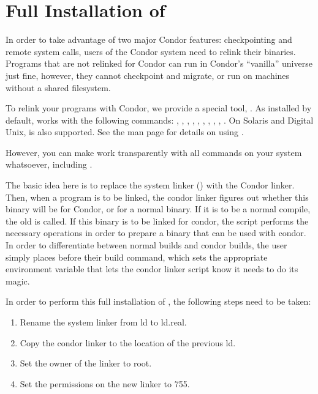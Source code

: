 \section{Full Installation of }

In order to take advantage of two major Condor features: checkpointing
and remote system calls, users of the Condor system need to relink
their binaries.  Programs that are not relinked for Condor can run in
Condor's ``vanilla'' universe just fine, however, they cannot
checkpoint and migrate, or run on machines without a shared filesystem.

To relink your programs with Condor, we provide a special tool,
.  As installed by default,  works
with the following commands: , , ,
, , , , ,
, .  On Solaris and Digital Unix,  is
also supported.  See the  man page for details on
using .

However, you can make  work transparently with all
commands on your system whatsoever, including .  

The basic idea here is to replace the system linker () with
the Condor linker.  Then, when a program is to be linked, the condor
linker figures out whether this binary will be for Condor, or for a
normal binary.  If it is to be a normal compile, the old  is
called.  If this binary is to be linked for condor, the script
performs the necessary operations in order to prepare a binary that
can be used with condor.  In order to differentiate between normal
builds and condor builds, the user simply places 
 before their build command, which sets the
appropriate environment variable that lets the condor linker script
know it needs to do its magic.

In order to perform this full installation of , the
following steps need to be taken:
	
\begin{enumerate}
	\item Rename the system linker from ld to ld.real.
	\item Copy the condor linker to the location of the previous ld.
	\item Set the owner of the linker to root.
	\item Set the permissions on the new linker to 755.
\end{enumerate}

